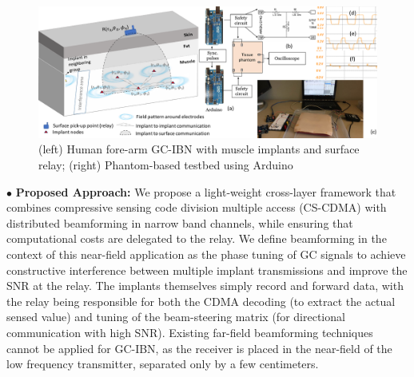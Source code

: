 \begin{figure}[h]
 \centering
\includegraphics[width=\textwidth]{figures/GC_beamforming/expr2.pdf}  
 \vspace{-2mm} 
 \caption{\label{fig:expr} (left) Human fore-arm GC-IBN with muscle implants and surface relay; (right) Phantom-based testbed using Arduino}
 \vspace{-5mm}
  \end{figure}

\noindent $\bullet$ \textbf{Proposed Approach:} We propose a light-weight cross-layer framework that combines compressive sensing code division multiple access (CS-CDMA) with distributed beamforming in narrow band channels, while ensuring that computational costs are delegated to the relay. We define beamforming in the context of this near-field application as the phase tuning of GC signals to achieve constructive interference between multiple implant transmissions and improve the SNR at the relay. The implants themselves simply record and forward data, with the relay being responsible for both the CDMA decoding (to extract the actual sensed value) and tuning of the beam-steering matrix (for directional communication with high SNR). Existing far-field beamforming techniques cannot be applied for GC-IBN, as the receiver is placed in the near-field of the low frequency transmitter, separated only by a few centimeters. 

